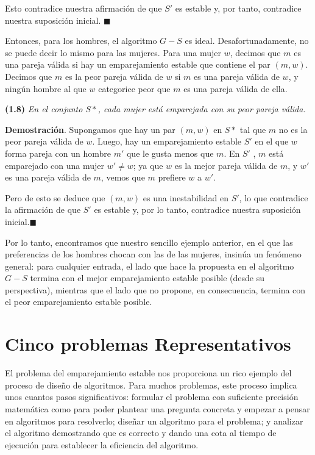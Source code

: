 \documentclass[a4paper, 12pt]{book}
\begin{document}
Esto contradice nuestra afirmación de que $S'$ es estable y, por tanto, contradice nuestra suposición inicial. $\blacksquare$

Entonces, para los hombres, el algoritmo $G-S$ es ideal. Desafortunadamente, no se puede decir lo mismo para las mujeres. Para una mujer $w$, decimos que $m$ es una pareja válida si hay un emparejamiento estable que contiene el par $(m, w)$. Decimos que $m$ es la peor pareja válida de $w$ si $m$ es una pareja válida de $w$, y ningún hombre al que $w$ categorice peor que $m$ es una pareja válida de ella.

\vspace{3mm}
\noindent\textbf{(1.8)} \textit{En el conjunto $S*$, cada mujer está emparejada con su peor pareja válida.}
\vspace{2mm}

\textbf{Demostración}. Supongamos que hay un par $(m, w)$ en $S*$ tal que $m$ no es la peor pareja válida de $w$. Luego, hay un emparejamiento estable $S'$ en el que $w$ forma pareja con un hombre $m'$ que le gusta menos que $m$. En $S'$ , $m$ está emparejado con una mujer $w'\neq w$; ya que $w$ es la mejor pareja válida de $m$, y $w'$ es una pareja válida de $m$, vemos que $m$ prefiere $w$ a $w'$.

Pero de esto se deduce que $(m, w)$ es una inestabilidad en $S'$, lo que contradice la afirmación de que $S'$ es estable y, por lo tanto, contradice nuestra suposición inicial.$ \blacksquare $

Por lo tanto, encontramos que nuestro sencillo ejemplo anterior, en el que las preferencias de los hombres chocan con las de las mujeres, insinúa un fenómeno general: para cualquier entrada, el lado que hace la propuesta en el algoritmo $G-S$ termina con el mejor emparejamiento estable posible (desde su perspectiva), mientras que el lado que no propone, en consecuencia, termina con el peor emparejamiento estable posible.

\section{Cinco problemas Representativos}

El problema del emparejamiento estable nos proporciona un rico ejemplo del proceso de diseño de algoritmos. Para muchos problemas, este proceso implica unos cuantos pasos significativos: formular el problema con suficiente precisión matemática como para poder plantear una pregunta concreta y empezar a pensar en algoritmos para resolverlo; diseñar un algoritmo para el problema; y analizar el algoritmo demostrando que es correcto y dando una cota al tiempo de ejecución para establecer la eficiencia del algoritmo.
\end{document}
